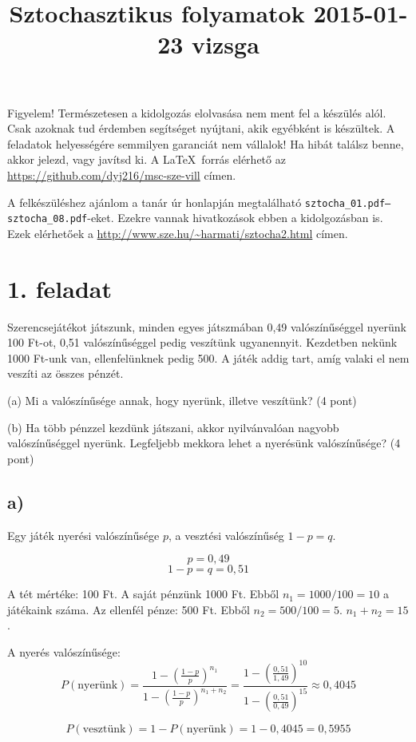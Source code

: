 \documentclass[a4paper,12pt]{article}   		%
\title{Sztochasztikus folyamatok 2015-01-23 vizsga}
\begin{document}
\maketitle

Figyelem! Természetesen a kidolgozás elolvasása nem ment fel a készülés
alól. Csak azoknak tud érdemben segítséget nyújtani, akik egyébként is
készültek. A feladatok helyességére semmilyen garanciát nem vállalok!
Ha hibát találsz benne, akkor jelezd, vagy javítsd ki. A \LaTeX\ forrás
elérhető az \url{https://github.com/dyj216/msc-sze-vill} címen.

A felkészüléshez ajánlom a tanár úr honlapján megtalálható 
\texttt{\mbox{sztocha\_01.pdf}--\mbox{sztocha\_08.pdf}}-eket. Ezekre vannak hivatkozások 
ebben a kidolgozásban is. Ezek elérhetőek a 
\url{http://www.sze.hu/~harmati/sztocha2.html} címen.

\section*{1. feladat}
Szerencsejátékot játszunk, minden egyes játszmában 0,49 valószínűséggel
nyerünk 100 Ft-ot, 0,51 valószínűséggel pedig veszítünk ugyanennyit. 
Kezdetben nekünk 1000 Ft-unk van, ellenfelünknek pedig 500. A játék
addig tart, amíg valaki el nem veszíti az összes pénzét.

(a) Mi a valószínűsége annak, hogy nyerünk, illetve veszítünk? (4 pont)

(b) Ha több pénzzel kezdünk játszani, akkor nyilvánvalóan nagyobb 
valószínűséggel nyerünk. Legfeljebb mekkora lehet a nyerésünk
valószínűsége? (4 pont)
\subsection*{a)}
Egy játék nyerési valószínűsége $p$, a vesztési valószínűség $1-p=q$.

\[p = 0,49\]
\[1-p = q = 0,51\]

A tét mértéke: 100 Ft. A saját pénzünk 1000 Ft. Ebből $n_1 = 1000/100=10$ a 
játékaink száma. Az ellenfél pénze: 500 Ft. Ebből $n_2 = 500/100=5$.
$n_1 + n_2 = 15$.

A nyerés valószínűsége:
\[P(\text{nyerünk}) = \frac{1-\left(\frac{1-p}{p}\right)^{n_1}}
{1-\left(\frac{1-p}{p}\right)^{n_1+n_2}} = 
\frac{1-\left(\frac{0,51}{1,49}\right)^{10}}
{1-\left(\frac{0,51}{0,49}\right)^{15}} \approx 0,4045 \]

\[P(\text{vesztünk}) = 1 - P(\text{nyerünk}) = 1 - 0,4045 = 0,5955\]
\end{document}
